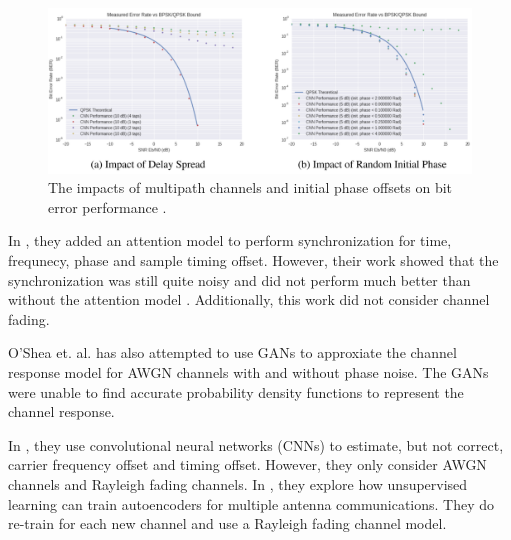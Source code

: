 \begin{figure}
\begin{center}
\includegraphics[width=16cm]{figures/osheaatt2.png}
\caption{The impacts of multipath channels and initial phase offsets on bit error performance \cite{osheaatt}.}
\label{fig:oshea}
\end{center}
\end{figure}

In \cite{osheasynch}, they added an attention model to perform synchronization for time, frequnecy, phase and sample timing offset.  However, their work showed that the synchronization was still quite noisy and did not perform much better than without the attention model \cite{osheaatt}.  Additionally, this work did not consider channel fading. 

O'Shea et. al. has also attempted to use GANs to approxiate the channel response model for AWGN channels with and without phase noise\cite{osheavoid}.  The GANs were unable to find accurate probability density functions to represent the channel response.  

In \cite{osheacsi}, they use convolutional neural networks (CNNs) to estimate, but not correct, carrier frequency offset and timing offset.  However, they only consider AWGN channels and Rayleigh fading channels.  
In \cite{osheamimo}, they explore how unsupervised learning can train autoencoders for multiple antenna communications.  They do re-train for each new channel and use a Rayleigh fading channel model.